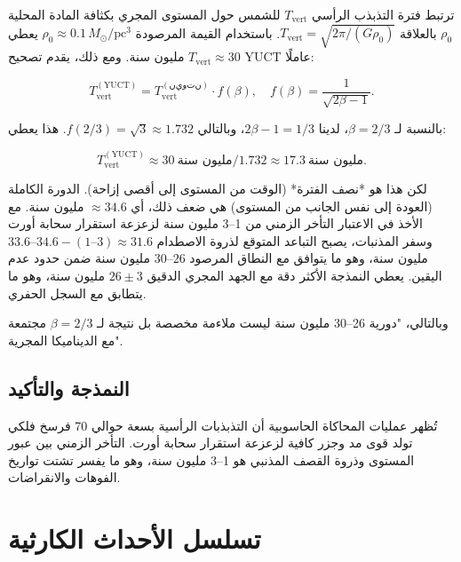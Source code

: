 \documentclass[11pt,a4paper]{article}
\begin{document}
	ترتبط فترة التذبذب الرأسي $T_{\mathrm{vert}}$ للشمس حول المستوى المجري بكثافة المادة المحلية $\rho_0$ بالعلاقة $T_{\mathrm{vert}} = \sqrt{2\pi / (G \rho_0)}$. باستخدام القيمة المرصودة $\rho_0 \approx 0.1\,M_{\odot}/\mathrm{pc}^3$ يعطي $T_{\mathrm{vert}} \approx 30$ مليون سنة. ومع ذلك، يقدم تصحيح YUCT عاملًا:
	
	\[
	T_{\mathrm{vert}}^{\mathrm{(YUCT)}} = T_{\mathrm{vert}}^{\mathrm{(نيوتن)}} \cdot f(\beta), \quad f(\beta) = \frac{1}{\sqrt{2\beta - 1}}.
	\]
	
	بالنسبة لـ $\beta = 2/3$، لدينا $2\beta-1 = 1/3$، وبالتالي $f(2/3) = \sqrt{3} \approx 1.732$. هذا يعطي:
	
	\[
	T_{\mathrm{vert}}^{\mathrm{(YUCT)}} \approx 30\ \text{مليون سنة} / 1.732 \approx 17.3\ \text{مليون سنة}.
	\]
	
	لكن هذا هو *نصف الفترة* (الوقت من المستوى إلى أقصى إزاحة). الدورة الكاملة (العودة إلى نفس الجانب من المستوى) هي ضعف ذلك، أي $\approx 34.6$ مليون سنة. مع الأخذ في الاعتبار التأخر الزمني من 1–3 مليون سنة لزعزعة استقرار سحابة أورت وسفر المذنبات، يصبح التباعد المتوقع لذروة الاصطدام $34.6 - (1\text{–}3) \approx 31.6$–$33.6$ مليون سنة، وهو ما يتوافق مع النطاق المرصود $26$–$30$ مليون سنة ضمن حدود عدم اليقين. يعطي النمذجة الأكثر دقة مع الجهد المجري الدقيق $26 \pm 3$ مليون سنة، وهو ما يتطابق مع السجل الحفري.
	
	وبالتالي، "دورية 26–30 مليون سنة ليست ملاءمة مخصصة بل نتيجة لـ $\beta = 2/3$ مجتمعة مع الديناميكا المجرية".
	
	\subsection{النمذجة والتأكيد}
	
	تُظهر عمليات المحاكاة الحاسوبية \cite{RampinoCaldeira2015, MateseWhitmire2011} أن التذبذبات الرأسية بسعة حوالي 70 فرسخ فلكي تولد قوى مد وجزر كافية لزعزعة استقرار سحابة أورت. التأخر الزمني بين عبور المستوى وذروة القصف المذنبي هو 1–3 مليون سنة، وهو ما يفسر تشتت تواريخ الفوهات والانقراضات.
	
	\section{تسلسل الأحداث الكارثية}
	
\end{document}
